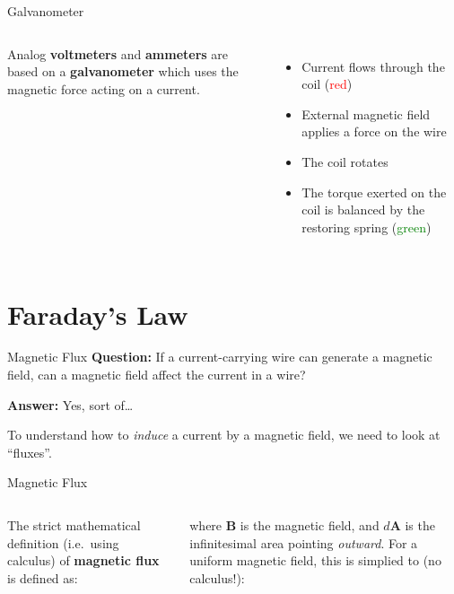 \documentclass[12pt,aspectratio=169]{beamer}
\begin{document}
\begin{frame}{Galvanometer}
  \begin{columns}
    \centering

    Analog \textbf{voltmeters} and \textbf{ammeters} are based on a
    \textbf{galvanometer} which uses the magnetic force acting on a current.
    \begin{itemize}
    \item Current flows through the coil (\textcolor{red}{red})
    \item External magnetic field applies a force on the wire
    \item The coil rotates
    \item The torque exerted on the coil is balanced by the restoring spring
      (\textcolor{green}{green})
    \end{itemize}
  \end{columns}
\end{frame}



\section{Faraday's Law}

\begin{frame}{Magnetic Flux}
  \textbf{Question:} If a current-carrying wire can generate a magnetic field,
  can a magnetic field affect the current in a wire?

  \vspace{.3in}\textbf{Answer:} Yes, sort of\ldots

  \vspace{.3in}To understand how to \emph{induce} a current by a magnetic field,
  we need to look at ``fluxes''.
\end{frame}



\begin{frame}{Magnetic Flux}
  \begin{columns}
  

    \vspace{.2in}The strict mathematical definition (i.e.\ using calculus) of
    \textbf{magnetic flux} is defined as:
    
    
    where $\bm{B}$ is the magnetic field, and $d\bm{A}$ is the infinitesimal
    area pointing \emph{outward}. For a uniform magnetic field, this is
    simplied to (no calculus!):

  \end{columns}
\end{frame}
\end{document}
